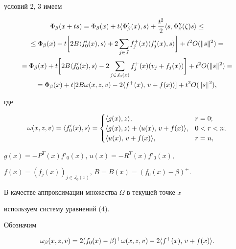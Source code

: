 условий 2, 3 имеем 


\begin{multline} 


\Phi_\beta(x+ts)=\Phi_\beta(x)+t\la\Phi'_\beta(x),s\ra+ 


\frac{t^2}{2}\la s,\Phi''_\beta(\zeta)s\ra \le \\ 


\le \Phi_\beta(x)+t\bigg[2B\la f'_0(x),s\ra+ 


2\sum_{j\in J}f^+_j(x)\la f'_j(x),s\ra\bigg]+t^2O(\|s\|^2) = \\ 


=\Phi_\beta(x)+t\bigg[2B\la f'_0(x),s\ra- 


2\sum_{j\in J_0(x)}f^+_j(x)(v_j+f_j(x))\bigg]+ 


t^2O(\|s\|^2)= \\ 


= \Phi_\beta(x)+t[2B\omega(x,z,v)-2\la f^+(x),\,v+f(x)\ra ]+ 


t^2O(\|s\|^2), 


\end{multline} 


где 


\begin{equation} 


\omega(x,z,v)=\la f'_0(x),s\ra= 


\begin{cases} 


\la g(x),z\ra, & r=0;\\ 


\la g(x),z\ra+\la u(x),\,v+f(x)\ra, & 0<r<n;\\ 


\la u(x),\,v+f(x)\ra, & r=n, 


\end{cases} 


\end{equation} 


$g(x)=-P^T(x)f'_0(x)$, $u(x)=-R^T(x)f'_0(x)$, 


$f(x)=(f_j(x))_{j\in J_0(x)}$, $B=B(x)=(f_0(x)-\beta)^+$. 


 


В качестве аппроксимации множества $\Omega$ в текущей точке $x$ 


используем систему уравнений (4). 


 


Обозначим 


\begin{equation} 


\omega_\beta(x,z,v)=2(f_0(x)-\beta)^+\omega(x,z,v)- 


2\la f^+(x),\,v+f(x)\ra. 


\end{equation} 


